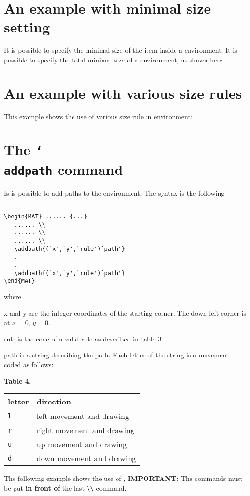 \documentclass[a4paper,final,11pt]{article}
\begin{document}
\section{An example with minimal size setting}
It is possible to specify the minimal size of the item inside a
 environment:
It is possible to specify the total minimal size of a 
environment, as shown here


\section{An example with various size rules}
This example shows the use of various size rule in  
environment:


\section{The \texttt{\char`\\addpath} command}
Is is possible to add paths to the  environment. The syntax 
is the following
\begin{verbatim}

\begin{MAT} ...... {...}
   ...... \\
   ...... \\
   ...... \\
   \addpath{(`x',`y',`rule')`path'}
   .
   .
   \addpath{(`x',`y',`rule')`path'}
\end{MAT}

\end{verbatim}
where
\begin{desc}
  \item[x and y] are the integer coordinates of the starting
  corner.  The down left corner is at $x=0$, $y=0$.
  \item[rule] is the code of a valid rule as described in table 3.
  \item[path] is a string describing the path.  Each letter of the
  string is a movement coded as follows:
  \begin{center}
    \textbf{Table 4.} \\[1em]
    \begin{tabular}{|l|l|}
      \hline
      letter & direction \\
      \hline
      \verb|l| & left movement and drawing \\
      \verb|r| & right movement and drawing \\
      \verb|u| & up movement and drawing \\
      \verb|d| & down movement and drawing \\
      \hline
    \end{tabular}
  \end{center}
\end{desc}
The following example shows the use of ,
\textbf{IMPORTANT:} The commands  must be put
\textbf{in front of} the last \verb+\\+ command.
\end{document}
